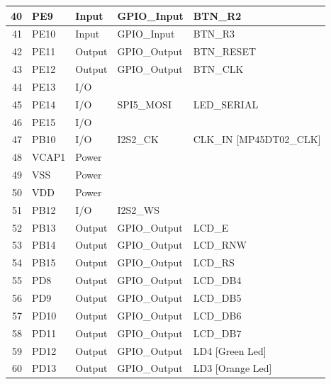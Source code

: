 \documentclass[12pt,a4paper]{report}
\begin{document}
\begin{longtable}[c]{|r|l|l|r|r|}
		\hline
		40    & PE9   & Input & \multicolumn{1}{l|}{GPIO\_Input} & \multicolumn{1}{l|}{BTN\_R2} \\
		\hline
		41    & PE10  & Input & \multicolumn{1}{l|}{GPIO\_Input} & \multicolumn{1}{l|}{BTN\_R3} \\
		\hline
		42    & PE11  & Output & \multicolumn{1}{l|}{GPIO\_Output} & \multicolumn{1}{l|}{BTN\_RESET} \\
		\hline
		43    & PE12  & Output & \multicolumn{1}{l|}{GPIO\_Output} & \multicolumn{1}{l|}{BTN\_CLK} \\
		\hline
		44    & PE13  & I/O   &       &  \\
		\hline
		45    & PE14  & I/O   & \multicolumn{1}{l|}{SPI5\_MOSI} & \multicolumn{1}{l|}{LED\_SERIAL} \\
		\hline
		46    & PE15  & I/O   &       &  \\
		\hline
		47    & PB10  & I/O   & \multicolumn{1}{l|}{I2S2\_CK} & \multicolumn{1}{l|}{CLK\_IN [MP45DT02\_CLK]} \\
		\hline
		48    & VCAP1 & Power &       &  \\
		\hline
		49    & VSS   & Power &       &  \\
		\hline
		50    & VDD   & Power &       &  \\
		\hline
		51    & PB12  & I/O   & \multicolumn{1}{l|}{I2S2\_WS} &  \\
		\hline
		52    & PB13  & Output & \multicolumn{1}{l|}{GPIO\_Output} & \multicolumn{1}{l|}{LCD\_E} \\
		\hline
		53    & PB14  & Output & \multicolumn{1}{l|}{GPIO\_Output} & \multicolumn{1}{l|}{LCD\_RNW} \\
		\hline
		54    & PB15  & Output & \multicolumn{1}{l|}{GPIO\_Output} & \multicolumn{1}{l|}{LCD\_RS} \\
		\hline
		55    & PD8   & Output & \multicolumn{1}{l|}{GPIO\_Output} & \multicolumn{1}{l|}{LCD\_DB4} \\
		\hline
		56    & PD9   & Output & \multicolumn{1}{l|}{GPIO\_Output} & \multicolumn{1}{l|}{LCD\_DB5} \\
		\hline
		57    & PD10  & Output & \multicolumn{1}{l|}{GPIO\_Output} & \multicolumn{1}{l|}{LCD\_DB6} \\
		\hline
		58    & PD11  & Output & \multicolumn{1}{l|}{GPIO\_Output} & \multicolumn{1}{l|}{LCD\_DB7} \\
		\hline
		59    & PD12  & Output & \multicolumn{1}{l|}{GPIO\_Output} & \multicolumn{1}{l|}{LD4 [Green Led]} \\
		\hline
		60    & PD13  & Output & \multicolumn{1}{l|}{GPIO\_Output} & \multicolumn{1}{l|}{LD3 [Orange Led]} \\

\end{longtable}
\end{document}
